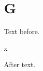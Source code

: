\documentclass{closettwin}
\begin{document}
\mainmatter
\chapter{G}
Text before.
\begin{insightbox}[L]x\end{insightbox}
After text.
\end{document}
